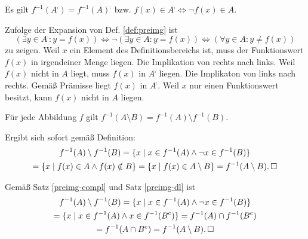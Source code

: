 \begin{Satz}\label{preimg-compl}
Es gilt $f^{-1}(A^\comp)=f^{-1}(A)^\comp$ bzw.
$f(x)\in A^\comp\Leftrightarrow \neg f(x)\in A$.
\end{Satz}
\begin{Beweis} Zufolge der Expansion von Def. \ref{def:preimg} ist
\[(\exists y\in A^\comp\colon y=f(x))\iff \neg (\exists y\in A\colon y=f(x))
\iff (\forall y\in A\colon y\ne f(x))\]
zu zeigen. Weil $x$ ein Element des Definitionsbereichs ist, muss
der Funktionswert $f(x)$ in irgendeiner Menge liegen. Die Implikation
von rechts nach links. Weil $f(x)$ nicht in $A$ liegt, muss $f(x)$
in $A^\comp$ liegen. Die Implikaton von links nach rechts.
Gemäß Prämisse liegt $f(x)$ in $A^\comp$. Weil $x$ nur einen
Funktionswert besitzt, kann $f(x)$ nicht in $A$ liegen.\,\qedsymbol
\end{Beweis}

\begin{Satz}\label{preimg-setminus}
Für jede Abbildung $f$ gilt
$f^{-1}(A\setminus B) = f^{-1}(A)\setminus f^{-1}(B)$.
\end{Satz}
\begin{Beweis}[Beweis 1] Ergibt sich sofort gemäß Definition:
\begin{gather*}
f^{-1}(A)\setminus f^{-1}(B) = \{x\mid x\in f^{-1}(A)\land \neg x\in f^{-1}(B)\}\\
= \{x\mid f(x)\in A\land f(x)\notin B\}
= \{x\mid f(x)\in A\setminus B\}
= f^{-1}(A\setminus B).\,\square
\end{gather*}
\end{Beweis}
\begin{Beweis}[Beweis 2] Gemäß Satz \ref{preimg-compl} und Satz
\ref{preimg-dl} ist
\begin{gather*}
f^{-1}(A)\setminus f^{-1}(B) = \{x\mid x\in f^{-1}(A)\land \neg x\in f^{-1}(B)\}\\
= \{x\mid x\in f^{-1}(A)\land x\in f^{-1}(B^\mathrm c)\}
= f^{-1}(A)\cap f^{-1}(B^\mathrm c)\\
= f^{-1}(A\cap B^\mathrm c) = f^{-1}(A\setminus B).\,\square
\end{gather*}
\end{Beweis}

